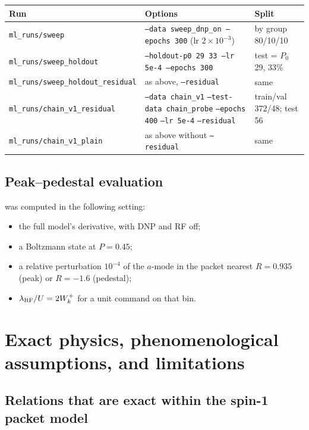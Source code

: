 \documentclass[11pt]{article}
\newcommand{\code}[1]{\texttt{#1}}
\begin{document}
\begin{longtable}{L{0.27\textwidth} L{0.42\textwidth} L{0.23\textwidth}}
\toprule
Run & Options & Split\\
\midrule
\code{ml\_runs/sweep} & \code{--data sweep\_dnp\_on --epochs 300} (lr \(2\times10^{-3}\)) & by group 80/10/10\\
\code{ml\_runs/sweep\_holdout} & \code{--holdout-p0 29 33 --lr 5e-4 --epochs 300} & test = \(P_0\) 29, 33\%\\
\code{ml\_runs/sweep\_}\newline\code{holdout\_residual} & as above, \code{--residual} & same\\
\code{ml\_runs/chain\_}\newline\code{v1\_residual} & \code{--data chain\_v1} \code{--test-data chain\_probe} \code{--epochs 400} \code{--lr 5e-4} \code{--residual} & train/val 372/48; test 56\\
\code{ml\_runs/chain\_v1\_plain} & as above without \code{--residual} & same\\
\bottomrule
\end{longtable}

\subsection{Peak--pedestal evaluation}

 was computed in the following setting:
\begin{itemize}
\item the full model's derivative, with DNP and RF off;
\item a Boltzmann state at \(P=0.45\);
\item a relative perturbation \(10^{-4}\) of the \(a\)-mode in the packet nearest \(R=0.935\) (peak) or \(R=-1.6\) (pedestal);
\item \(\lambda_{\rm RF}/U=2W^+_k\) for a unit command on that bin.
\end{itemize}

\section{Exact physics, phenomenological assumptions, and limitations}
\label{sec:limits}

\subsection{Relations that are exact within the spin-1 packet model}
\end{document}
